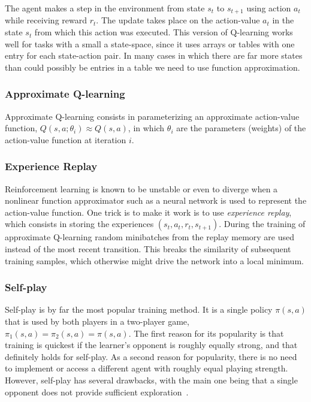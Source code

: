 \documentclass{article}
\newcommand{\GithubURL}[1]{[\href{https://github.com/davidrobles/mlnd-capstone-code/blob/master/#1}{source}]}
\begin{document}
The agent makes a step in the environment from state $s_t$ to $s_{t+1}$ using action $a_t$ while
receiving reward $r_t$. The update takes place on the action-value $a_t$ in the state $s_t$ from
which this action was executed. This version of Q-learning works well for tasks with a small a
state-space, since it uses arrays or tables with one entry for each state-action pair. In many cases
in which there are far more states than could possibly be entries in a table we need to use function
approximation.

\subsubsection{Approximate Q-learning}

Approximate Q-learning consists in parameterizing an approximate action-value function,
$Q(s,a;\theta_i) \approx Q(s,a)$, in which $\theta_i$ are the parameters (weights) of the
action-value function at iteration $i$.

\subsubsection{Experience Replay}

Reinforcement learning is known to be unstable or even to diverge when a nonlinear function
approximator such as a neural network is used to represent the action-value function. One trick is
to make it work is to use \emph{experience replay}, which consists in storing the experiences $(s_t,
a_t, r_t, s_{t+1})$. During the training of approximate Q-learning random minibatches from the
replay memory are used instead of the most recent transition. This breaks the similarity of
subsequent training samples, which otherwise might drive the network into a local minimum.

\subsubsection{Self-play}


Self-play is by far the most popular training method. It is a single policy $\pi(s,a)$ that is used
by both players in a two-player game, $\pi_1(s,a) = \pi_2(s,a) = \pi(s,a)$. The first reason for its
popularity is that training is quickest if the learner's opponent is roughly equally strong, and
that definitely holds for self-play. As a second reason for popularity, there is no need to
implement or access a different agent with roughly equal playing strength. However, self-play has
several drawbacks, with the main one being that a single opponent does not provide sufficient
exploration~\citep{Szita2011RLGames}.
\end{document}
